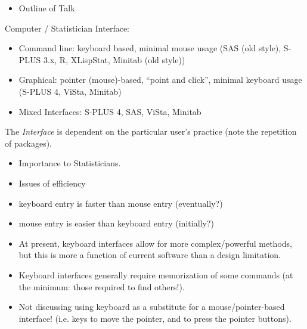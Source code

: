 \documentclass[semhelv]{seminar}
\begin{document}
\begin{itemize}
\item Outline of Talk
\end{itemize}

\begin{slide}
  
  Computer / Statistician Interface:
  \begin{itemize}
  \item Command line: keyboard based, minimal mouse usage (SAS (old
    style), S-PLUS 3.x, R, XLispStat, Minitab (old style))
  \item Graphical: pointer (mouse)-based, ``point and click'', minimal
    keyboard usage (S-PLUS 4, ViSta, Minitab)
  \item Mixed Interfaces: S-PLUS 4, SAS, ViSta, Minitab
  \end{itemize}
  
  The \emph{Interface} is dependent on the particular user's practice
  (note the repetition of packages).
\end{slide}


\begin{itemize}
\item Importance to Statisticians. 
\item Issues of efficiency
\end{itemize}

\begin{slide}
  
  \begin{itemize}
  \item keyboard entry is faster than mouse entry (eventually?)
  \item mouse entry is easier than keyboard entry (initially?)
  \item At present, keyboard interfaces allow for more
    complex/powerful methods, but this is more a function of current
    software than a design limitation.
  \item Keyboard interfaces generally require memorization of some
    commands (at the minimum: those required to find others!).
  \end{itemize}
\end{slide}

\begin{itemize}
\item Not discussing using keyboard as a substitute for a
  mouse/pointer-based interface!  (i.e. keys to move the pointer, and
  to press the pointer buttons).
\end{itemize}
\end{document}

